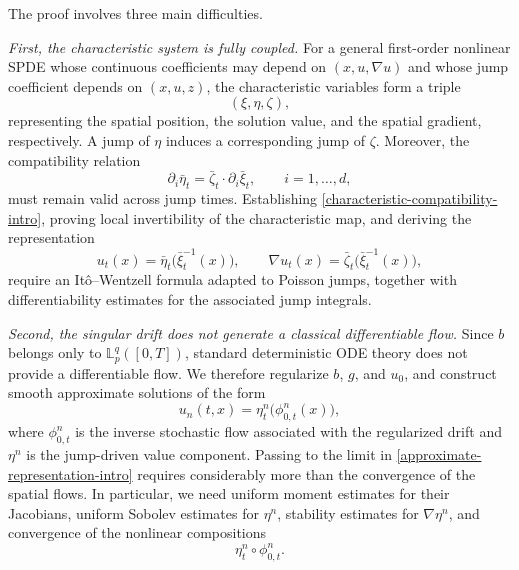 \documentclass[12pt,oneside, reqno]{amsart}
\def\mL{{\mathbb L}}
\numberwithin{equation}{section}
\begin{document}
	The proof involves three main difficulties.
	
	\medskip
	\noindent
	\emph{First, the characteristic system is fully coupled.}	For a general first-order nonlinear SPDE whose continuous coefficients	may depend on \((x,u,\nabla u)\) and whose jump coefficient depends on	\((x,u,z)\), the characteristic variables form a triple
	\[
	(\xi,\eta,\zeta),
	\]
	representing the spatial position, the solution value, and the spatial	gradient, respectively. A jump of \(\eta\) induces a corresponding jump	of \(\zeta\). Moreover, the compatibility relation
	\begin{equation}\label{characteristic-compatibility-intro}
		\partial_i\bar\eta_t
		=
		\bar\zeta_t\cdot\partial_i\bar\xi_t,
		\qquad
		i=1,\ldots,d,
	\end{equation}
	must remain valid across jump times. Establishing	\eqref{characteristic-compatibility-intro}, proving local invertibility	of the characteristic map, and deriving the representation
	\begin{equation}\label{characteristic-representation-intro}
		u_t(x)
		=
		\bar\eta_t\bigl(\bar\xi_t^{-1}(x)\bigr),
		\qquad
		\nabla u_t(x)
		=
		\bar\zeta_t\bigl(\bar\xi_t^{-1}(x)\bigr),
	\end{equation}
	require an It\^o--Wentzell formula adapted to Poisson jumps, together	with differentiability estimates for the associated jump integrals.
	
	\medskip
	\noindent
	\emph{Second, the singular drift does not generate a classical
		differentiable flow.}	Since \(b\) belongs only to \(\mL_p^q([0,T])\), standard deterministic	ODE theory does not provide a differentiable flow. We therefore	regularize \(b\), \(g\), and \(u_0\), and construct smooth approximate
	solutions of the form
	\begin{equation}\label{approximate-representation-intro}
		u_n(t,x)
		=
		\eta_t^n\bigl(\phi_{0,t}^n(x)\bigr),
	\end{equation}
	where \(\phi_{0,t}^n\) is the inverse stochastic flow associated with	the regularized drift and \(\eta^n\) is the jump-driven value component.	Passing to the limit in \eqref{approximate-representation-intro}	requires considerably more than the convergence of the spatial flows.	In particular, we need uniform moment estimates for their Jacobians,	uniform Sobolev estimates for \(\eta^n\), stability estimates for	\(\nabla\eta^n\), and convergence of the nonlinear compositions
	\[
	\eta_t^n\circ\phi_{0,t}^n.
	\]
	
\end{document}
